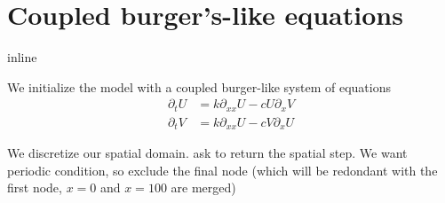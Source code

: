 \documentclass[letterpaper,10pt,english]{sphinxmanual}
\begin{document}
\noindent{}


\section{Coupled burger's-like equations}
\label{\detokenize{cookbook/so_wavy:coupled-burger-s-like-equations}}\label{\detokenize{cookbook/so_wavy::doc}}
\begin{sphinxVerbatim}[commandchars=\\\{\}]
   
   
 

   
   

   

      

 inline
\end{sphinxVerbatim}

We initialize the model with a coupled burger-like system of equations
\begin{align}
    \partial_{t}U &= k \partial_{xx} U - c U \partial_{x} V \\
    \partial_{t}V &= k \partial_{xx} U - c V \partial_{x} U
\end{align}
\begin{sphinxVerbatim}[commandchars=\\\{\}]
  \PYG{p}{[} \PYG{p}{]}
               \PYG{p}{[} \PYG{p}{]} \PYG{p}{[} \PYG{p}{]}
\end{sphinxVerbatim}

We discretize our spatial domain.  ask to return the
spatial step. We want periodic condition, so  exclude
the final node (which will be redondant with the first node, \(x=0\)
and \(x=100\) are merged)
\end{document}
